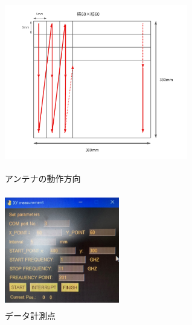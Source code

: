 \documentclass[12pt,a4paper]{jsreport}
\begin{document}




    \begin{figure}[htbp]
      \begin{minipage}[b]{0.45\linewidth}
        \centering
        \includegraphics[height=7cm,width=8cm]{./image/sweep.pdf}
        \caption{アンテナの動作方向}\label{アンテナの動作方向}
      \end{minipage}
      \begin{minipage}[b]{0.45\linewidth}
        \centering
        \includegraphics[height=5cm,width=5cm]{./dataimage/exp_image/gui.jpg}
        \caption{データ計測点}\label{データ計測点}
      \end{minipage}
    \end{figure}
\end{document}
